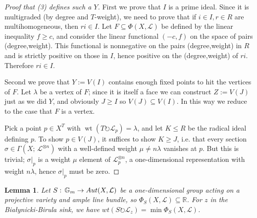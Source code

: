 \documentclass[10pt,a4paper]{amsart}
\newtheorem{lemma}[Thm]{Lemma}
\DeclareMathOperator{\wt}{wt}
\newcommand{\RR}{\mathbb{R}}
\newcommand\lie[1]{{\mathfrak #1}}
\newcommand\tensor\otimes
\newcommand\calL{{\mathcal L}}
\newcommand\Gm{{\mathbb G}_m}
\newcommand\junk[1]{}
\newcommand\actson\circlearrowright
\renewcommand{\colon}{\mathrel{:}}
\renewcommand{\colon}{:\mkern\thinmuskip}
\begin{document}
\begin{proof}[Proof that (3) defines such a $Y$\!]
  \junk{
  First we need to show that $\Phi(Y,\calL)$ is a face $F$ in the usual sense,
  i.e. there is a linear functional on $\Phi(X, \calL)$ minimized
  on exactly $\Phi(Y, \calL)$. Pick a coweight $S$ defining $Y$, and
  let $\sigma$ be the corresponding functional on $\lie t^*_\RR$
  Then since $Y$ is $S$-fixed pointwise, the functional $\sigma$ is
  constant on $\Phi(Y,\calL)$ by Proposition \ref{prop:spanOfPhi}.
  By the analysis in the proof of Lemma \ref{lem:fixedPoints}(2),
  a component $Z$ of $X^S$ is the sink iff the $S$-weight $\wt(S\actson\calL_p)$,
  $p\in X^S$ is minimized on $Z$. 

  Given a face $F \subseteq \Phi_T(X,\calL)$, there is a rational functional
  $\lie t^*_\RR$ minimized exactly on $F$, i.e. a rational coweight.
  Some positive multiple of it defines an actual coweight $S$.
  }

  First we prove that $I$ is a prime ideal. Since it is multigraded
  (by degree and $T$-weight), we need to prove that if $i\in I, r\in R$ are
  multihomogeneous, then $ri \in I$. Let $F \subseteq \Phi(X,\calL)$ be
  defined by the linear inequality $f\geq c$, and consider the linear
  functional $(-c,f)$ on the space of pairs (degree,weight).
  This functional is nonnegative on the pairs (degree,weight) in $R$
  and is strictly positive on those in $I$, hence positive on
  the (degree,weight) of $ri$. Therefore $ri \in I$.

  Second we prove that $Y := V(I)$ contains enough fixed points to
  hit the vertices of $F$. Let $\lambda$ be a vertex of $F$; since it
  is itself a face we can construct $Z := V(J)$ just as we did $Y$,
  and obviously $J\geq I$ so $V(J) \subseteq V(I)$. 
  In this way we reduce to the case that $F$ is a vertex.

  Pick a point $p\in X^T$ with $\wt(T\actson \calL_p) = \lambda$,
  and let $K\leq R$ be the radical ideal defining $p$.
  To show $p \in V(J)$, it suffices to show $K \geq J$,
  i.e. that every section $\sigma \in \Gamma(X;\, \calL^{\tensor n})$
  with a well-defined weight $\mu \neq n\lambda$ vanishes at $p$.
  But this is trivial; $\sigma|_p$ is a weight $\mu$ element of
  $\calL^{\tensor n}_p$, a one-dimensional representation with weight $n\lambda$,
  hence $\sigma|_p$ must be zero.
\end{proof}

\begin{lemma}\label{lem:sink}
  Let $S\colon \Gm\to Aut(X,\calL)$ be a one-dimensional group acting on a
  projective variety and ample line bundle, so $\Phi_S(X,\calL) \subseteq \RR$.
  For $z$ in the Bia\l ynicki-Birula sink, 
  we have $wt(S\actson \calL_z) = \min\Phi_S(X,\calL)$.
\end{lemma}
\end{document}
